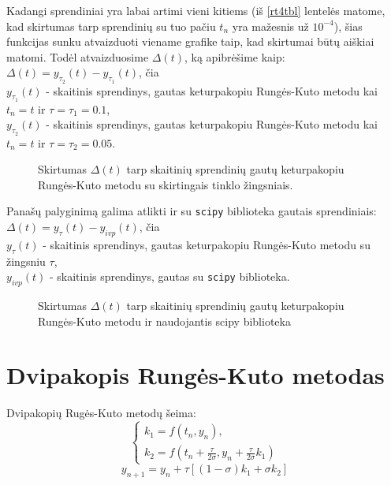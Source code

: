 \documentclass[]{VUMIFTemplateClass}
\newcommand{\tone}{0.1}
\newcommand{\ttwo}{0.05}
\begin{document}
Kadangi sprendiniai yra labai artimi vieni kitiems (iš \ref{rt4tbl} lentelės matome, kad skirtumas tarp sprendinių su tuo pačiu $t_n$ yra mažesnis už $10^{-4}$), šias funkcijas sunku atvaizduoti viename grafike taip, kad skirtumai būtų aiškiai matomi. Todėl atvaizduosime $\Delta(t)$, ką apibrėšime kaip:\\
$\Delta(t) = y_{\tau_2}(t) - y_{\tau_1}(t)$, čia\\
$y_{\tau_1}(t)$ - skaitinis sprendinys, gautas keturpakopiu Rungės-Kuto metodu kai $t_n = t$ ir $\tau = \tau_1 = \tone$,\\
$y_{\tau_2}(t)$ - skaitinis sprendinys, gautas keturpakopiu Rungės-Kuto metodu kai $t_n = t$ ir $\tau = \tau_2 = \ttwo$.

\begin{figure}[H]
    \begin{center}
        
    \end{center}
    \caption{Skirtumas $\Delta(t)$ tarp skaitinių sprendinių gautų keturpakopiu Rungės-Kuto metodu su skirtingais tinklo žingsniais.}
\end{figure}

Panašų palyginimą galima atlikti ir su \texttt{scipy} biblioteka gautais sprendiniais:\\
$\Delta(t) = y_{\tau}(t) - y_{ivp}(t)$, čia\\
$y_{\tau}(t)$ - skaitinis sprendinys, gautas keturpakopiu Rungės-Kuto metodu su žingsniu $\tau$,\\
$y_{ivp}(t)$ - skaitinis sprendinys, gautas su \texttt{scipy} biblioteka.
\begin{figure}[H]
    \begin{center}
        
    \end{center}
    \caption{Skirtumas $\Delta(t)$ tarp skaitinių sprendinių gautų keturpakopiu Rungės-Kuto metodu ir naudojantis scipy biblioteka}
\end{figure}

\section{Dvipakopis Rungės-Kuto metodas}
Dvipakopių Rugės-Kuto metodų šeima:
\begin{equation}
    \begin{cases}
        k_1 = f(t_n, y_n),\\
        k_2 = f(t_n + \frac{\tau}{2 \sigma}, y_n + \frac{\tau}{2 \sigma} k_1)
    \end{cases}
\end{equation}
\[ y_{n+1} = y_n + \tau [(1 - \sigma) k_1 + \sigma k_2]\]
\end{document}
